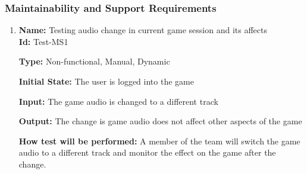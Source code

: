 \documentclass[12pt, titlepage]{article}
\begin{document}
\subsubsection{Maintainability and Support Requirements}
\begin{enumerate}
\item{\textbf{Name:} Testing audio change in current game session and its affects\\}\label{Test-MS1}
\textbf{Id:} Test-MS1

\textbf{Type:} Non-functional, Manual, Dynamic
					
\textbf{Initial State:} The user is logged into the game
					
\textbf{Input:} The game audio is changed to a different track 
					
\textbf{Output:} The change is game audio does not affect other aspects of the game
					
\textbf{How test will be performed:} A member of the team will switch the game audio to a different track and monitor the effect on the game after the change.
\end{enumerate}
\end{document}
